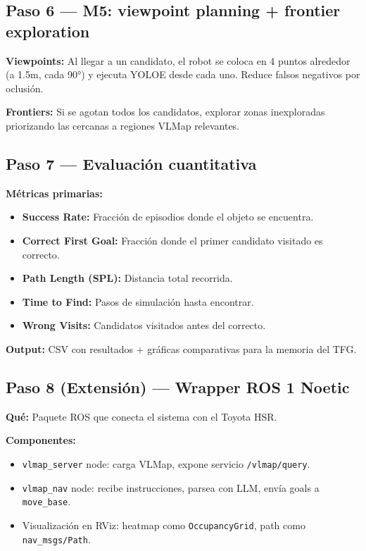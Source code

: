 \documentclass[11pt,a4paper]{article}
\begin{document}
\subsection{Paso 6 --- M5: viewpoint planning + frontier exploration}

\textbf{Viewpoints:} Al llegar a un candidato, el robot se coloca en 4 puntos alrededor (a 1.5m, cada 90°) y ejecuta YOLOE desde cada uno. Reduce falsos negativos por oclusión.

\textbf{Frontiers:} Si se agotan todos los candidatos, explorar zonas inexploradas priorizando las cercanas a regiones VLMap relevantes.

\subsection{Paso 7 --- Evaluación cuantitativa}

\textbf{Métricas primarias:}
\begin{itemize}
    \item \textbf{Success Rate:} Fracción de episodios donde el objeto se encuentra.
    \item \textbf{Correct First Goal:} Fracción donde el primer candidato visitado es correcto.
    \item \textbf{Path Length (SPL):} Distancia total recorrida.
    \item \textbf{Time to Find:} Pasos de simulación hasta encontrar.
    \item \textbf{Wrong Visits:} Candidatos visitados antes del correcto.
\end{itemize}

\textbf{Output:} CSV con resultados + gráficas comparativas para la memoria del TFG.

\subsection{Paso 8 (Extensión) --- Wrapper ROS 1 Noetic}

\textbf{Qué:} Paquete ROS que conecta el sistema con el Toyota HSR.

\textbf{Componentes:}
\begin{itemize}
    \item \texttt{vlmap\_server} node: carga VLMap, expone servicio \texttt{/vlmap/query}.
    \item \texttt{vlmap\_nav} node: recibe instrucciones, parsea con LLM, envía goals a \texttt{move\_base}.
    \item Visualización en RViz: heatmap como \texttt{OccupancyGrid}, path como \texttt{nav\_msgs/Path}.
\end{itemize}
\end{document}
